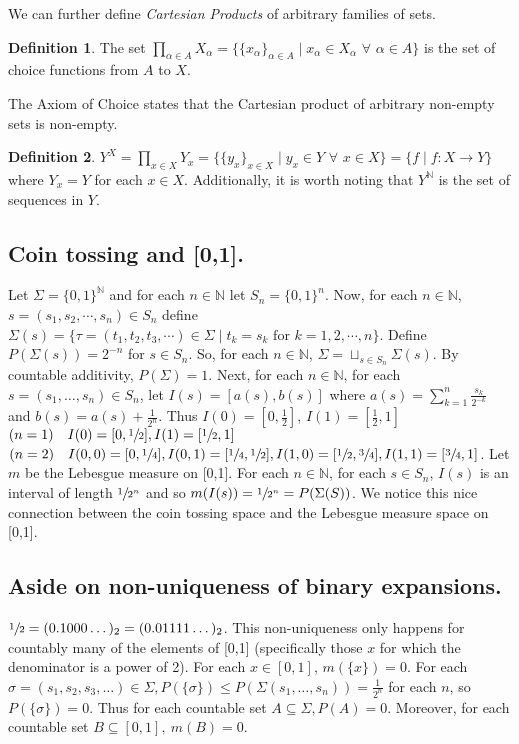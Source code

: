 \documentclass{article}
\newcommand{\N}{\mathbb{N}}
\theoremstyle{definition}
\newtheorem*{definition}{Definition}
\begin{document}
We can further define \emph{Cartesian Products} of arbitrary families of sets.

\begin{definition}
    The set $\prod_{\alpha \in A} X_\alpha = \{\{x_\alpha\}_{\alpha \in A} \mid x_\alpha \in X_\alpha\,\, \forall\,\, \alpha \in A\}$
    is the set of choice functions from $A$ to $X$.
\end{definition}

The Axiom of Choice states that the Cartesian product of arbitrary non-empty sets is non-empty.

\begin{definition}
    $Y^X = \prod_{x \in X} Y_x = \{\{y_x\}_{x \in X} \mid y_x \in Y \,\, \forall \,\, x \in X\} = \{f \mid f: X \rightarrow Y\}$ where $Y_x = Y$ for each $x \in X$. Additionally, it is worth noting that $Y^{\N}$ is the set of sequences in $Y$.
\end{definition}

\subsection*{Coin tossing and [0,1].}

Let $\Sigma = \{0,1\}^{\N}$ and for each $n\in \N$ let $S_n = \{0,1\}^n$. 
Now, for each $n \in \N$, $s = (s_1,s_2, \cdots, s_n) \in S_n$ define $\Sigma(s) = \{\tau = (t_1, t_2, t_3 ,\cdots) \in \Sigma \mid t_k = s_k \text{ for }k = 1,2, \cdots, n\}$.
Define $P(\Sigma(s)) = 2^{-n}$ for $s \in S_n$. So, for each $n \in \N$, $\Sigma = \sqcup_{s \in S_n} \Sigma(s)$. By countable additivity, $P(\Sigma) = 1$.
Next, for each $n \in \N$, for each $s = (s_1, \ldots, s_n) \in S_n$, let $I(s) = [a(s), b(s)]$ where $a(s) = \sum_{k=1}^n \frac{s_k}{2^{-k}}$ and $b(s) = a(s)+\frac{1}{2^n}$. Thus $I(0) = [0, \frac{1}{2}]$, $I(1) = [\frac{1}{2}, 1]$
$(n=1) \quad I(0) = [0,\sfrac12], I(1) = [\sfrac12,1]$
$(n=2) \quad I(0,0) = [0,\sfrac14], I(0,1) = [\sfrac14, \sfrac12], I(1,0) = [\sfrac12, \sfrac34], I(1,1) = [\sfrac34,1]$.
Let $m$ be the Lebesgue measure on [0,1]. For each $n\in \N$, for each $s \in S_n$, $I(s)$ is an interval of length $\sfrac{1}{2^n}$ and so $m(I(s)) = \sfrac1{2^n} = P(\Sigma(S))$.
We notice this nice connection between the coin tossing space and the Lebesgue measure space on [0,1].

\subsection*{Aside on non-uniqueness of binary expansions.}
$\sfrac12 = (0.1000\dots)_2 = (0.01111\dots)_2$. This non-uniqueness only happens for countably many of the elements of [0,1] (specifically those $x$ for which the denominator is a power of 2). For each $x \in [0,1]$, $m(\{x\}) = 0$. For each $\sigma = (s_1,s_2,s_3,\dots) \in \Sigma, P(\{\sigma\}) \leq P(\Sigma(s_1,\dots,s_n)) = \tfrac{1}{2^{n}}$ for each $n$, so $P(\{\sigma\}) = 0$. Thus for each countable set $A \subseteq \Sigma, P(A) = 0$. Moreover, for each countable set $B \subseteq [0,1],\ m(B) = 0$.
\end{document}
